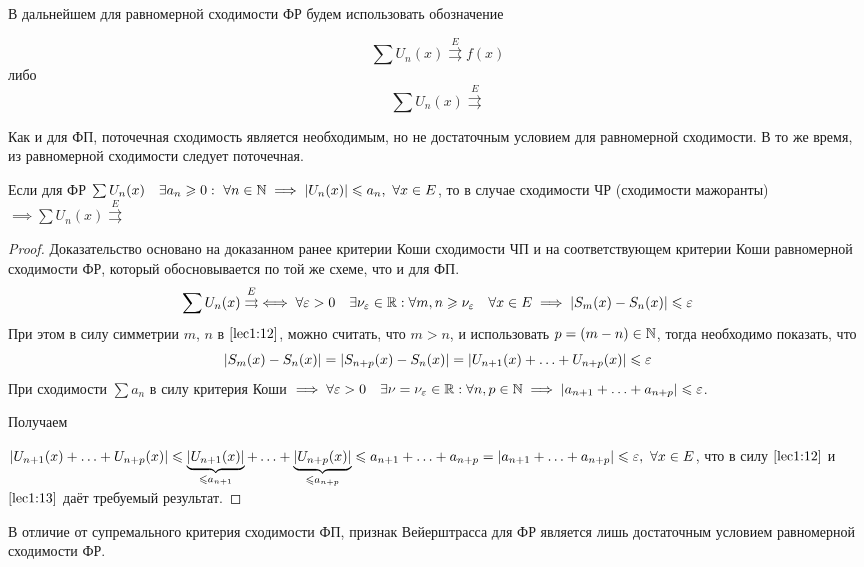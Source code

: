 \documentclass[../../main.tex]{subfiles}
\begin{document}
В дальнейшем для равномерной сходимости ФР будем использовать обозначение
 
\[ \sum U_n(x) \overset{E}{\rightrightarrows} f(x) \]
либо 
\[ \sum U_n(x) \overset{E}{\rightrightarrows} \]

Как и для ФП, поточечная сходимость является необходимым, 
но не достаточным условием для равномерной сходимости. В то же время,
из равномерной сходимости следует поточечная.

\begin{thm} 
Если для ФР $\sum U_n(x) \quad \exists a_n \geqslant 0 : \ \forall n \in \mathbb{N} 
\implies |U_n(x)| \leqslant a_n,\ \forall x \in E$, то в случае сходимости 
ЧР (сходимости мажоранты) $\implies \sum U_n(x) \overset{E}{\rightrightarrows}$
\end{thm}	 

\begin{proof}
Доказательство основано на доказанном ранее критерии Коши сходимости ЧП и на
соответствующем критерии Коши равномерной сходимости ФР, который обосновывается
по той же схеме, что и для ФП.
\begin{equation}
\label{lec1:12}
\sum U_n(x) \overset{E}{\rightrightarrows} \iff \forall \varepsilon > 0 \quad
\exists \nu_\varepsilon \in \mathbb{R} : \forall m,n \geqslant \nu_\varepsilon \quad
\forall x \in E \implies
|S_m(x) - S_n(x)| \leqslant \varepsilon
\end{equation}
При этом в силу симметрии $m$, $n$ в $\eqref{lec1:12}$, можно
считать, что $m > n$, и использовать $p = (m - n) \in \mathbb{N}$, тогда 
необходимо показать, что
\begin{equation}
\label{lec1:13}
|S_m(x) - S_n(x)| = |S_{n+p}(x) - S_n(x)| =
|U_{n+1}(x) + \ldots + U_{n+p}(x)| \leqslant \varepsilon
\end{equation}
При сходимости $\sum a_n$ в силу критерия Коши $\implies
\forall \varepsilon > 0 \quad \exists \nu = \nu_\varepsilon \in \mathbb{R} : 
\forall n, p \in \mathbb{N} \implies
|a_{n+1} + \ldots + a_{n+p}| \leqslant \varepsilon$.

Получаем

$|U_{n+1}(x) + \ldots + U_{n+p}(x)| \leqslant 
\underbrace{|U_{n+1}(x)|}_{\leqslant a_{n+1}} + \ldots + 
\underbrace{|U_{n+p}(x)|}_{\leqslant a_{n+p}} \leqslant
a_{n+1} + \ldots + a_{n+p} = |a_{n+1} + \ldots + a_{n+p}|
\leqslant \varepsilon,\ \forall x\in E$, что в силу $\eqref{lec1:12}$ и 
$\eqref{lec1:13}$ даёт требуемый результат.
\end{proof}	

\begin{rem}
В отличие от супремального критерия сходимости ФП,
признак Вейерштрасса для ФР является лишь достаточным условием 
равномерной сходимости ФР. 
\end{rem}	
\end{document}
